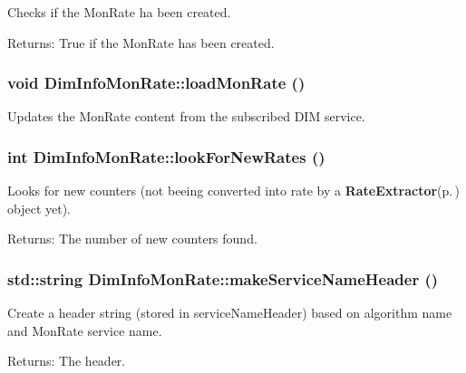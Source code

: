 Checks if the Mon\-Rate ha been created.

\begin{Desc}
\item[Returns:]True if the Mon\-Rate has been created.\end{Desc}
\subsubsection{\setlength{\rightskip}{0pt plus 5cm}void Dim\-Info\-Mon\-Rate::load\-Mon\-Rate ()}\label{classDimInfoMonRate_a3}


Updates the Mon\-Rate content from the subscribed DIM service.
\subsubsection{\setlength{\rightskip}{0pt plus 5cm}int Dim\-Info\-Mon\-Rate::look\-For\-New\-Rates ()\hspace{0.3cm}{\tt  [private]}}\label{classDimInfoMonRate_d1}


Looks for new counters (not beeing converted into rate by a {\bf Rate\-Extractor}{\rm (p.\,\pageref{classRateExtractor})} object yet).

\begin{Desc}
\item[Returns:]The number of new counters found.\end{Desc}
\subsubsection{\setlength{\rightskip}{0pt plus 5cm}std::string Dim\-Info\-Mon\-Rate::make\-Service\-Name\-Header ()\hspace{0.3cm}{\tt  [private]}}\label{classDimInfoMonRate_d2}


Create a header string (stored in service\-Name\-Header) based on algorithm name and Mon\-Rate service name.

\begin{Desc}
\item[Returns:]The header.\end{Desc}
